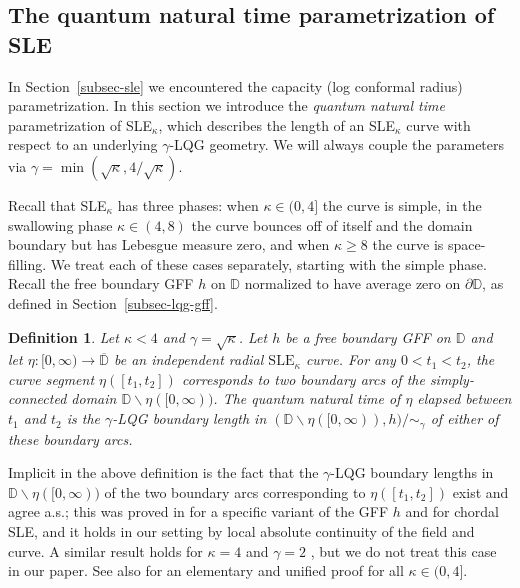 \documentclass[a4paper]{article}
\numberwithin{equation}{section}
\newcommand{\D}{\mathbb{D}}
\newcommand{\clD}{\overline{\mathbb{D}}}
\newcommand{\SLE}{\mathrm{SLE}}
\newtheorem{definition}[theorem]{Definition}
\theoremstyle{remark}
\numberwithin{equation}{section}
\begin{document}
\subsection{The quantum natural time parametrization of SLE}\label{subsec-quantum-parametrization-SLE}
In Section~\ref{subsec-sle} we encountered the capacity (log conformal radius) parametrization. In this section we introduce the \emph{quantum natural time} parametrization of SLE$_\kappa$, which describes the length of an SLE$_\kappa$ curve with respect to an underlying $\gamma$-LQG geometry. We will always couple the parameters via $\gamma = \min(\sqrt\kappa, 4/\sqrt\kappa)$.


Recall that SLE$_\kappa$ has three phases: when $\kappa \in (0,4]$ the curve is simple, in the swallowing phase $\kappa \in (4,8)$ the curve bounces off of itself and the domain boundary but has Lebesgue measure zero, and when $\kappa \geq 8$ the curve is space-filling. We treat each of these cases separately, starting with the simple phase. Recall the free boundary GFF $h$ on $\D$ normalized to have average zero on $\partial \D$, as defined in Section~\ref{subsec-lqg-gff}.

\begin{definition}\label{def-quantum-time-simple}
    Let $\kappa < 4$ and $\gamma = \sqrt \kappa$. Let $h$ be a free boundary GFF on $\D$ and let $\eta: [0,\infty) \to \clD$ be an independent radial $\SLE_\kappa$ curve. For any $0 < t_1 < t_2$,
    the curve segment $\eta([t_1, t_2])$ corresponds to two boundary arcs of the simply-connected domain $\D \backslash \eta([0,\infty))$. 
    The \emph{quantum natural time} of $\eta$ elapsed between $t_1$ and $t_2$ is the $\gamma$-LQG boundary length in $(\D \backslash \eta([0,\infty)), h)/{\sim_\gamma}$ of either of these boundary arcs.
\end{definition}
Implicit in the above definition is the fact that the $\gamma$-LQG boundary lengths in $\D \backslash \eta([0,\infty))$ of the two boundary arcs corresponding to $\eta([t_1, t_2])$ exist and agree a.s.; this was proved in \cite{shef-zipper} for a specific variant of the GFF $h$ and for chordal SLE, and it holds in our setting by local absolute continuity of the field and curve. A similar result holds for $\kappa = 4$ and $\gamma = 2$ \cite{hp-welding}, but we do not treat this case in our paper. 
See also \cite{ps-quantum-length} for an elementary and unified proof for all $\kappa \in (0,4]$. 
\end{document}
